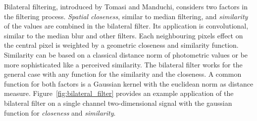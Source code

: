 Bilateral filtering, introduced by Tomasi and Manduchi\cite{tomasi_iccv98}, considers two factors in the filtering process.
\emph{Spatial closeness}, similar to median filtering, and \emph{similarity} of the values are combined in the bilateral filter.
Its application is convolutional, similar to the median blur and other filters.
Each neighbouring pixels effect on the central pixel is weighted by a geometric closeness and similarity function.
Similarity can be based on a classical distance norm of photometric values or be more sophisticated like a perceived similarity.
The bilateral filter works for the general case with any function for the similarity and the closeness.
A common function for both factors is a Gaussian kernel with the euclidean norm as distance measure.
Figure~\ref{fig:bilateral_filter} provides an example application of the bilateral filter on a single channel two-dimensional signal with the gaussian function for \emph{closeness} and \emph{similarity}.
